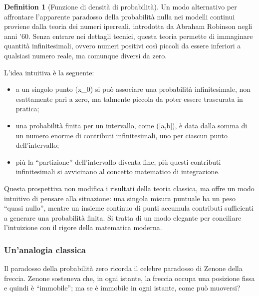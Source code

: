 \documentclass[
  letterpaper,
  DIV=11,
  numbers=noendperiod,
  oneside]{scrreprt}
\providecommand{\tightlist}{%
  \setlength{\itemsep}{0pt}\setlength{\parskip}{0pt}}
\theoremstyle{definition}
\theoremstyle{plain}
\theoremstyle{definition}
\newtheorem{definition}{Definition}[chapter]
\theoremstyle{remark}
\begin{document}
\begin{definition}[Funzione di densità di
probabilità]
Un modo alternativo per affrontare l'apparente paradosso della
probabilità nulla nei modelli continui proviene dalla teoria dei numeri
iperreali, introdotta da Abraham Robinson negli anni '60. Senza entrare
nei dettagli tecnici, questa teoria permette di immaginare quantità
infinitesimali, ovvero numeri positivi così piccoli da essere inferiori
a qualsiasi numero reale, ma comunque diversi da zero.

L'idea intuitiva è la seguente:

\begin{itemize}
\tightlist
\item
  a un singolo punto (x\_0) si può associare una probabilità
  infinitesimale, non esattamente pari a zero, ma talmente piccola da
  poter essere trascurata in pratica;
\item
  una probabilità finita per un intervallo, come ({[}a,b{]}), è data
  dalla somma di un numero enorme di contributi infinitesimali, uno per
  ciascun punto dell'intervallo;
\item
  più la ``partizione'' dell'intervallo diventa fine, più questi
  contributi infinitesimali si avvicinano al concetto matematico di
  integrazione.
\end{itemize}

Questa prospettiva non modifica i risultati della teoria classica, ma
offre un modo intuitivo di pensare alla situazione: una singola misura
puntuale ha un peso ``quasi nullo'', mentre un insieme continuo di punti
accumula contributi sufficienti a generare una probabilità finita. Si
tratta di un modo elegante per conciliare l'intuizione con il rigore
della matematica moderna.

\begin{tcolorbox}[enhanced jigsaw, arc=.35mm, breakable, colbacktitle=quarto-callout-note-color!10!white, opacityback=0, toprule=.15mm, rightrule=.15mm, colback=white, opacitybacktitle=0.6, leftrule=.75mm, coltitle=black, bottomtitle=1mm, left=2mm, toptitle=1mm, title=\textcolor{quarto-callout-note-color}{\faInfo}\hspace{0.5em}{Esempio: Il paradosso di Zenone}, titlerule=0mm, bottomrule=.15mm, colframe=quarto-callout-note-color-frame]

\subsubsection*{Un'analogia classica}\label{unanalogia-classica}

Il paradosso della probabilità zero ricorda il celebre paradosso di
Zenone della freccia. Zenone sosteneva che, in ogni istante, la freccia
occupa una posizione fissa e quindi è ``immobile''; ma se è immobile in
ogni istante, come può muoversi?


\end{tcolorbox}
\end{definition}
\end{document}

